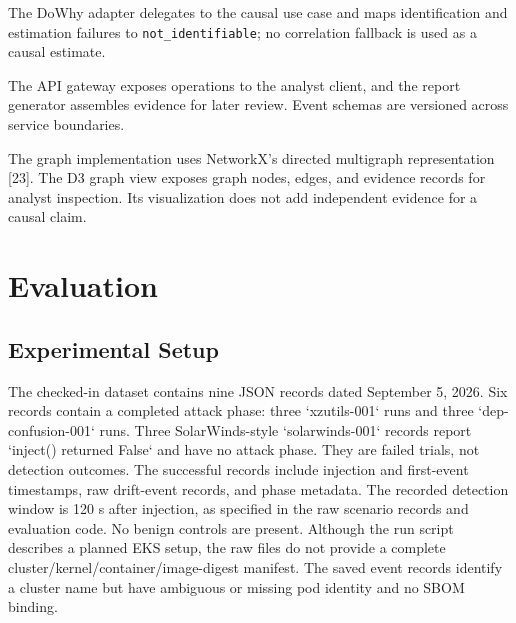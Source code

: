 \documentclass[conference]{IEEEtran}
\begin{document}
The DoWhy adapter delegates to the causal use case and maps identification and estimation failures to \texttt{not\_identifiable}; no correlation fallback is used as a causal estimate.

The API gateway exposes operations to the analyst client, and the report generator assembles evidence for later review. Event schemas are versioned across service boundaries.

The graph implementation uses NetworkX's directed multigraph representation [23]. The D3 graph view exposes graph nodes, edges, and evidence records for analyst inspection. Its visualization does not add independent evidence for a causal claim.

\section{Evaluation}
\subsection{Experimental Setup}
The checked-in dataset contains nine JSON records dated September 5, 2026. Six records contain a completed attack phase: three `xzutils-001` runs and three `dep-confusion-001` runs. Three SolarWinds-style `solarwinds-001` records report `inject() returned False` and have no attack phase. They are failed trials, not detection outcomes. The successful records include injection and first-event timestamps, raw drift-event records, and phase metadata. The recorded detection window is 120 s after injection, as specified in the raw scenario records and evaluation code. No benign controls are present. Although the run script describes a planned EKS setup, the raw files do not provide a complete cluster/kernel/container/image-digest manifest. The saved event records identify a cluster name but have ambiguous or missing pod identity and no SBOM binding.
\end{document}
